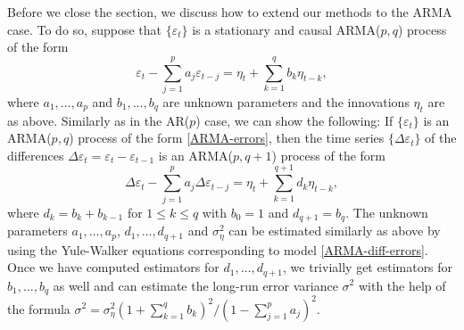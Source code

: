 Before we close the section, we discuss how to extend our methods to the ARMA case. To do so, suppose that $\{ \varepsilon_t \}$ is a stationary and causal ARMA($p,q$) process of the form 
\begin{equation}\label{ARMA-errors} 
\varepsilon_t - \sum_{j=1}^p a_j \varepsilon_{t-j} = \eta_t + \sum\limits_{k=1}^q b_k \eta_{t-k}, 
\end{equation} 
where $a_1,\ldots,a_p$ and $b_1,\ldots,b_q$ are unknown parameters and the innovations $\eta_t$ are as above. Similarly as in the AR($p$) case, we can show the following: If $\{\varepsilon_t\}$ is an ARMA($p,q$) process of the form \eqref{ARMA-errors}, then the time series $\{ \Delta \varepsilon_t \}$ of the differences $\Delta \varepsilon_t = \varepsilon_t - \varepsilon_{t-1}$ is an ARMA($p,q+1$) process of the form 
\begin{equation}\label{ARMA-diff-errors} 
\Delta \varepsilon_t - \sum_{j=1}^p a_j \Delta \varepsilon_{t-j} = \eta_t + \sum\limits_{k=1}^{q+1} d_k \eta_{t-k},
\end{equation}
where $d_k = b_k + b_{k-1}$ for $1 \le k \le q$ with $b_0 = 1$ and $d_{q+1} = b_q$. The unknown parameters $a_1,\ldots,a_p$, $d_1,\ldots,d_{q+1}$ and $\sigma_\eta^2$ can be estimated similarly as above by using the Yule-Walker equations corresponding to model \eqref{ARMA-diff-errors}. Once we have computed estimators for $d_1,\ldots,d_{q+1}$, we trivially get estimators for $b_1,\ldots,b_q$ as well and can estimate the long-run error variance $\sigma^2$ with the help of the formula $\sigma^2 = \sigma^2_\eta (1+\sum_{k=1}^q b_k)^2 / ( 1-\sum_{j=1}^p a_j)^2$. 



